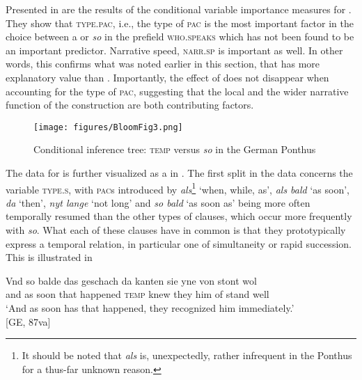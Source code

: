 \documentclass[output=paper,colorlinks,citecolor=brown]{langscibook}
\begin{document}
\largerpage
Presented in  are the results of the conditional variable importance measures for . They show that \textsc{type.pac}, i.e., the type of \textsc{pac} is the most important factor in the choice between a  or \textit{so} in the prefield \textsc{who.speaks} which has not been found to be an important predictor. Narrative speed, \textsc{narr.sp} is important as well. In other words, this confirms what was noted earlier in this section, that  has more explanatory value than . Importantly, the effect of  does not disappear when accounting for the type of \textsc{pac}, suggesting that the local  and the wider narrative function of the construction are both contributing factors.

\begin{figure}
\caption{Conditional inference tree: \textsc{temp} versus \textit{so} in the German Ponthus}\label{fig:2}
	\texttt{[image: figures/BloomFig3.png]}
\end{figure}

The data for  is further visualized as a  in . The first split in the data concerns the variable \textsc{type.s}, with \textsc{pac}s introduced by \textit{als}\footnote{It should be noted that \textit{als} is, unexpectedly, rather infrequent in the Ponthus for a thus-far unknown reason.} `when, while, as', \textit{als bald} `as soon', \textit{da} `then', \textit{nyt lange} `not long' and \textit{so bald} `as soon as' being more often temporally resumed than the other types of clauses, which occur more frequently with \textit{so}. What each of these clauses have in common is that they prototypically express a temporal relation, in particular one of simultaneity or rapid succession. This is illustrated in 
 
\ea\label{ex:darsu}
\gll Vnd so balde das geschach da kanten sie yne von stont wol\\ 
and as soon that happened \textsc{temp} knew they him of stand well\\
\glt `And as soon has that happened, they recognized him immediately.'\\ \hfill [GE, 87va]
\z
\end{document}
